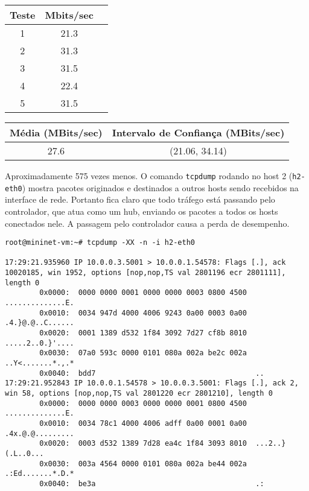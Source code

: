 \documentclass[12pt,letterpaper]{article}
\begin{document}
\begin{center}
\begin{tabular}{ |c|c|c| } 
 \hline
 Teste & Mbits/sec \\
 \hline
 1 & 21.3 \\ 
 2 & 31.3 \\ 
 3 & 31.5 \\ 
 4 & 22.4 \\ 
 5 & 31.5 \\ 
 \hline
\end{tabular}
\end{center}


\begin{center}
\begin{tabular}{|c|c|}
 \hline
 Média (MBits/sec) & Intervalo de Confiança (MBits/sec)\\
 \hline
 27.6 & (21.06, 34.14) \\
 \hline
 \end{tabular}
\end{center}

Aproximadamente 575 vezes menos. O comando \texttt{tcpdump} rodando no host 2 (\texttt{h2-eth0}) mostra pacotes originados e destinados a outros hosts sendo recebidos na interface de rede. Portanto fica claro que todo tráfego está passando pelo controlador, que atua como um hub, enviando os pacotes a todos os hosts conectados nele. A passagem pelo controlador causa a perda de desempenho.

\begin{tiny}
\begin{verbatim}
root@mininet-vm:~# tcpdump -XX -n -i h2-eth0

17:29:21.935960 IP 10.0.0.3.5001 > 10.0.0.1.54578: Flags [.], ack 10020185, win 1952, options [nop,nop,TS val 2801196 ecr 2801111], length 0
        0x0000:  0000 0000 0001 0000 0000 0003 0800 4500  ..............E.
        0x0010:  0034 947d 4000 4006 9243 0a00 0003 0a00  .4.}@.@..C......
        0x0020:  0001 1389 d532 1f84 3092 7d27 cf8b 8010  .....2..0.}'....
        0x0030:  07a0 593c 0000 0101 080a 002a be2c 002a  ..Y<.......*.,.*
        0x0040:  bdd7                                     ..
17:29:21.952843 IP 10.0.0.1.54578 > 10.0.0.3.5001: Flags [.], ack 2, win 58, options [nop,nop,TS val 2801220 ecr 2801210], length 0
        0x0000:  0000 0000 0003 0000 0000 0001 0800 4500  ..............E.
        0x0010:  0034 78c1 4000 4006 adff 0a00 0001 0a00  .4x.@.@.........
        0x0020:  0003 d532 1389 7d28 ea4c 1f84 3093 8010  ...2..}(.L..0...
        0x0030:  003a 4564 0000 0101 080a 002a be44 002a  .:Ed.......*.D.*
        0x0040:  be3a                                     .:
\end{verbatim}
\end{tiny}
\end{document}

